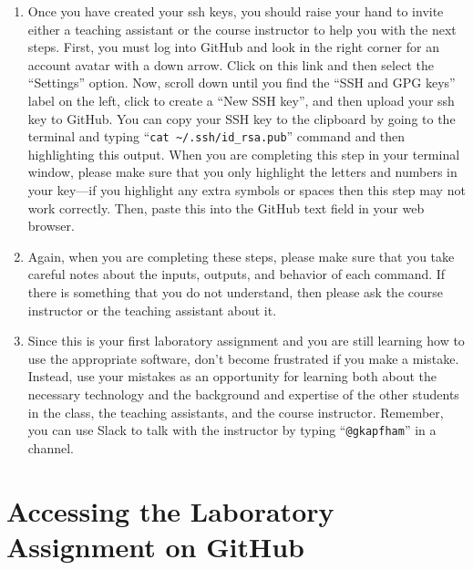 \documentclass[11pt]{article}
\newcommand{\command}[1]{``\lstinline{#1}''}
\begin{document}
\begin{enumerate}
  \item Once you have created your ssh keys, you should raise your hand to invite either a teaching assistant or the
    course instructor to help you with the next steps. First, you must log into GitHub and look in the right corner for
    an account avatar with a down arrow. Click on this link and then select the ``Settings'' option. Now, scroll down
    until you find the ``SSH and GPG keys'' label on the left, click to create a ``New SSH key'', and then upload your
    ssh key to GitHub. You can copy your SSH key to the clipboard by going to the terminal and typing ``{\tt cat
    \textasciitilde{}/.ssh/id\_rsa.pub}'' command and then highlighting this output. When you are completing this step
    in your terminal window, please make sure that you only highlight the letters and numbers in your key---if you
    highlight any extra symbols or spaces then this step may not work correctly. Then, paste this into the GitHub text
    field in your web browser.

  \item Again, when you are completing these steps, please make sure that you take careful notes about the inputs,
    outputs, and behavior of each command. If there is something that you do not understand, then please ask the course
    instructor or the teaching assistant about it.

  \item Since this is your first laboratory assignment and you are still learning how to use the appropriate software,
    don't become frustrated if you make a mistake. Instead, use your mistakes as an opportunity for learning both about
    the necessary technology and the background and expertise of the other students in the class, the teaching
    assistants, and the course instructor. Remember, you can use Slack to talk with the instructor by typing
    \command{@gkapfham} in a channel.

\end{enumerate}

\section*{Accessing the Laboratory Assignment on GitHub}
\end{document}
